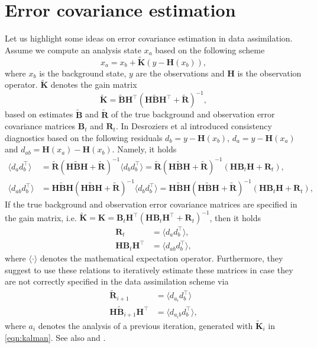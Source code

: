 \documentclass[a4paper,10pt]{article}
\numberwithin{equation}{section}
\begin{document}
\section{Error covariance estimation}
Let us highlight some ideas on error covariance estimation in data assimilation. 
Assume we compute an analysis state $x_a$ based on the following scheme 
\begin{equation}
\label{eqn:kalman}
x_a=x_b+\tilde{\mathbf K}(y-\mathbf H(x_b)),
\end{equation}
where $x_b$ is the background state, $y$ are the observations and $\mathbf H$ is the observation operator. $\tilde{\mathbf K}$ denotes the gain matrix 
\begin{equation*}
\tilde{\mathbf K}=\tilde{\mathbf B} \mathbf H^\top(\mathbf H \tilde{\mathbf B}\mathbf H^\top+\tilde{\mathbf R})^{-1},
\end{equation*}
based on estimates $\tilde{\mathbf B}$ and $\tilde{\mathbf R}$ of the true background and observation error covariance matrices $\mathbf B_t$ and $\mathbf R_t$. In \cite{desroziers} Desroziers et al introduced consistency diagnostics based on the following residuals
$d_b=y-\mathbf H(x_b)$, $d_a=y-\mathbf H(x_a)$ and $d_{ab}=\mathbf H(x_a)-\mathbf H(x_b)$. Namely, it holds 
\begin{align*}
\langle d_ad_b^\top \rangle &= \tilde {\mathbf R}(\mathbf H \tilde{\mathbf B}\mathbf H+\tilde{\mathbf R})^{-1}\langle d_bd_b^\top \rangle 
= \tilde {\mathbf R}(\mathbf H \tilde{\mathbf B}\mathbf H+\tilde{\mathbf R})^{-1}(\mathbf H \mathbf B_t\mathbf H+\mathbf R_t),\\
\langle d_{ab}d_b^\top \rangle &= \mathbf H\tilde {\mathbf B}\mathbf H(\mathbf H \tilde{\mathbf B}\mathbf H+\tilde{\mathbf R})^{-1}\langle d_bd_b^\top \rangle 
=  \mathbf H\tilde {\mathbf B}\mathbf H(\mathbf H \tilde{\mathbf B}\mathbf H+\tilde{\mathbf R})^{-1}(\mathbf H \mathbf B_t\mathbf H+\mathbf R_t),
\end{align*}
If the true background and observation error covariance matrices are specified in the gain matrix, i.e. $\tilde{\mathbf K}=\mathbf K=\mathbf B_t \mathbf H^\top(\mathbf H \mathbf B_t\mathbf H^\top+\mathbf R_t)^{-1}$, then it holds
\begin{align*}
\mathbf R_t&= \langle d_ad_b^\top\rangle,\\
\mathbf H\mathbf B_t\mathbf H^\top&=\langle d_{ab}d_b^\top\rangle,
\end{align*}
where $\langle \cdot \rangle$ denotes the mathematical expectation operator. 
 Furthermore, they suggest to use these relations to iteratively estimate these matrices in case they are not correctly specified in the data assimilation scheme via 
 \begin{align*}
 \tilde {\mathbf R}_{i+1}&= \langle d_{a_i}d_b^\top\rangle\\
\mathbf H\tilde {\mathbf B}_{i+1}\mathbf H^\top&=\langle d_{a_ib}d_b^\top\rangle,
 \end{align*}
 where $a_i$ denotes the analysis of a previous iteration, generated with $\tilde{\mathbf K}_i$  in \eqref{eqn:kalman}. 
 See also \cite{menard} and  \cite{gauthier}.
\end{document}
